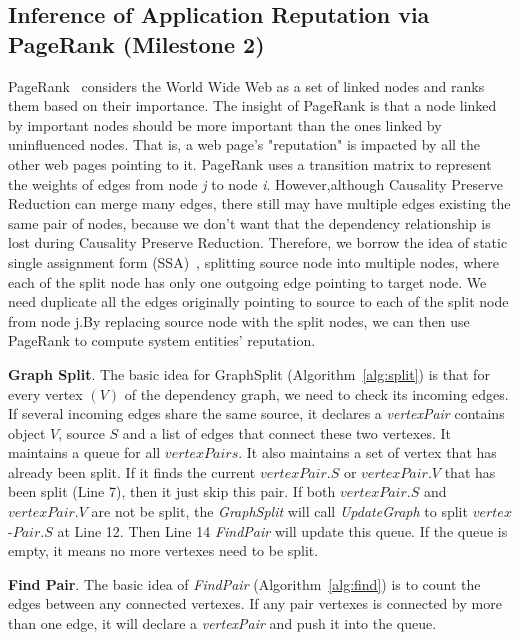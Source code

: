 \subsection{Inference of Application Reputation via\\PageRank (Milestone 2)}

PageRank~\cite{pagerank} considers the World Wide Web as a set of linked nodes and ranks them based on their importance. The insight of PageRank is that a node linked by important nodes should be more important than the ones linked by uninfluenced nodes. That is, a web page's "reputation" is impacted by all the other web pages pointing to it. PageRank uses a transition matrix to represent the weights of edges from node \textit{j} to node \textit{i}. However,although Causality Preserve Reduction can merge many edges, there still may have multiple edges existing the same pair of nodes, because we don't want that the dependency relationship is lost during Causality Preserve Reduction. Therefore, we borrow the idea of static single assignment form (SSA)~\cite{nielson2004principles}, splitting source node  into multiple nodes, where each of the split node has only one outgoing edge pointing to target node. We need duplicate all the edges originally pointing to source to each of the split node from node j.By replacing source node with the split nodes, we can then use PageRank to compute system entities' reputation.

\textbf{Graph Split}.
The basic idea for GraphSplit (Algorithm~\ref{alg:split}) is that for every vertex $(V)$ of the dependency graph, we need to check its incoming edges. If several incoming edges share the same source, it declares a \textit{vertexPair} contains object $V$, source $S$ and a list of edges that connect these two vertexes. It maintains a queue for all $vertexPairs$. It also maintains a set of vertex that has already been split. If it finds the current $vertexPair.S$ or $vertexPair.V$ that has been split (Line 7), then it just skip this pair. If both  $vertexPair.S$ and $vertexPair.V$  are not be split, the \textit{GraphSplit} will call \textit{UpdateGraph} to split $vertex$-$Pair.S$ at Line 12. Then Line 14 \textit{FindPair} will update this queue. If the queue is empty, it means no more vertexes need to be split.

\textbf{Find Pair}.
The basic idea of \emph{FindPair} (Algorithm~\ref{alg:find}) is to count the edges between any connected vertexes. If any pair vertexes is connected by more than one edge, it will declare a \textit{vertexPair} and push it into the queue. 

